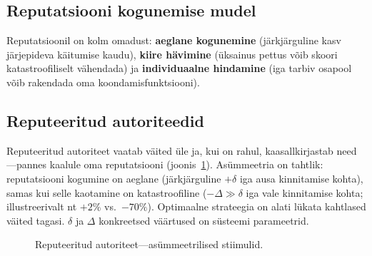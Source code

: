 \documentclass[11pt,a4paper,twocolumn]{article}
\begin{document}
\subsection{Reputatsiooni kogunemise mudel}

Reputatsioonil on kolm omadust: \textbf{aeglane kogunemine} (järkjärguline kasv järjepideva käitumise kaudu), \textbf{kiire hävimine} (üksainus pettus võib skoori katastroofiliselt vähendada) ja \textbf{individuaalne hindamine} (iga tarbiv osapool võib rakendada oma koondamisfunktsiooni).

\subsection{Reputeeritud autoriteedid}

Reputeeritud autoriteet vaatab väited üle ja, kui on rahul, kaasallkirjastab need---pannes kaalule oma reputatsiooni (joonis~\ref{fig:authority}). Asümmeetria on tahtlik: reputatsiooni kogumine on aeglane (järkjärguline $+\delta$ iga ausa kinnitamise kohta), samas kui selle kaotamine on katastroofiline ($-\Delta \gg \delta$ iga vale kinnitamise kohta; illustreerivalt nt $+2\%$ vs.\ $-70\%$). Optimaalne strateegia on alati lükata kahtlased väited tagasi. $\delta$ ja $\Delta$ konkreetsed väärtused on süsteemi parameetrid.

\begin{figure}[ht]
\centering
{}
\caption{Reputeeritud autoriteet---asümmeetrilised stiimulid.}
\label{fig:authority}
\end{figure}
\end{document}
